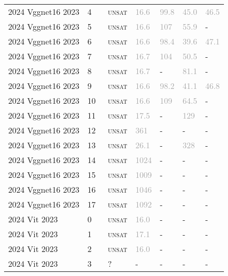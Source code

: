 \begin{center}
{\begin{longtable}{@{}lllllll@{}}
2024 Vggnet16 2023 & 4 & ~\textsc{unsat} & \textcolor{darkgray}{16.6} & \textcolor{darkgray}{99.8} & \textcolor{darkgray}{45.0} & \textcolor{darkgray}{46.5} \\
2024 Vggnet16 2023 & 5 & ~\textsc{unsat} & \textcolor{darkgray}{16.6} & \textcolor{darkgray}{107} & \textcolor{darkgray}{55.9} & - \\
2024 Vggnet16 2023 & 6 & ~\textsc{unsat} & \textcolor{darkgray}{16.6} & \textcolor{darkgray}{98.4} & \textcolor{darkgray}{39.6} & \textcolor{darkgray}{47.1} \\
2024 Vggnet16 2023 & 7 & ~\textsc{unsat} & \textcolor{darkgray}{16.7} & \textcolor{darkgray}{104} & \textcolor{darkgray}{50.5} & - \\
2024 Vggnet16 2023 & 8 & ~\textsc{unsat} & \textcolor{darkgray}{16.7} & - & \textcolor{darkgray}{81.1} & - \\
2024 Vggnet16 2023 & 9 & ~\textsc{unsat} & \textcolor{darkgray}{16.6} & \textcolor{darkgray}{98.2} & \textcolor{darkgray}{41.1} & \textcolor{darkgray}{46.8} \\
2024 Vggnet16 2023 & 10 & ~\textsc{unsat} & \textcolor{darkgray}{16.6} & \textcolor{darkgray}{109} & \textcolor{darkgray}{64.5} & - \\
2024 Vggnet16 2023 & 11 & ~\textsc{unsat} & \textcolor{darkgray}{17.5} & - & \textcolor{darkgray}{129} & - \\
2024 Vggnet16 2023 & 12 & ~\textsc{unsat} & \textcolor{darkgray}{361} & - & - & - \\
2024 Vggnet16 2023 & 13 & ~\textsc{unsat} & \textcolor{darkgray}{26.1} & - & \textcolor{darkgray}{328} & - \\
2024 Vggnet16 2023 & 14 & ~\textsc{unsat} & \textcolor{darkgray}{1024} & - & - & - \\
2024 Vggnet16 2023 & 15 & ~\textsc{unsat} & \textcolor{darkgray}{1009} & - & - & - \\
2024 Vggnet16 2023 & 16 & ~\textsc{unsat} & \textcolor{darkgray}{1046} & - & - & - \\
2024 Vggnet16 2023 & 17 & ~\textsc{unsat} & \textcolor{darkgray}{1092} & - & - & - \\
\midrule
2024 Vit 2023 & 0 & ~\textsc{unsat} & \textcolor{darkgray}{16.0} & - & - & - \\
2024 Vit 2023 & 1 & ~\textsc{unsat} & \textcolor{darkgray}{17.1} & - & - & - \\
2024 Vit 2023 & 2 & ~\textsc{unsat} & \textcolor{darkgray}{16.0} & - & - & - \\
2024 Vit 2023 & 3 & ~? & - & - & - & - \\

\end{longtable}}
\end{center}
